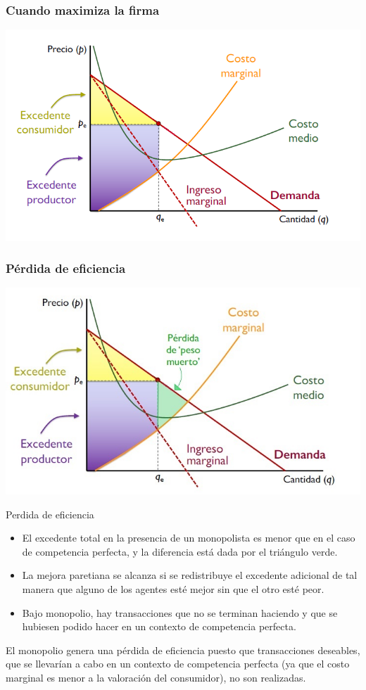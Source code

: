 \documentclass{beamer}
\begin{document}
\begin{frame}
\frametitle{Cuando maximiza la firma}
\includegraphics[scale=0.6]{../Figures/Tema_06.41_excedente4.png}
\end{frame}

\begin{frame}
\frametitle{Pérdida de eficiencia}
\includegraphics[scale=0.6]{../Figures/Tema_06.42_excedente5.jpg}
\end{frame}

\begin{frame}{Perdida de eficiencia}
    \begin{itemize}
        \item El excedente total en la presencia
        de un monopolista es menor que en el caso de competencia perfecta, y la
        diferencia está dada por el triángulo verde.
        \item La mejora paretiana se
        alcanza si se redistribuye el excedente adicional de tal manera que alguno
        de los agentes esté mejor sin que el otro esté peor.
        \item Bajo monopolio, hay transacciones que no se terminan haciendo y que se hubiesen podido hacer en un contexto de competencia perfecta.
    \end{itemize}
    \begin{boxA}
        El monopolio genera una pérdida de eficiencia puesto que transacciones deseables, que se llevarían a cabo en un contexto de competencia perfecta 
        (ya que el costo marginal es menor a la valoración del consumidor), no son realizadas.
    \end{boxA}
\end{frame}
\end{document}
